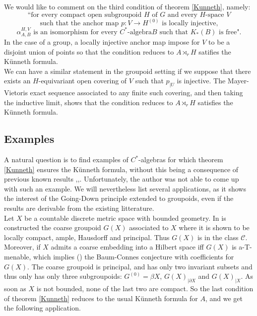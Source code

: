 \begin{rk}
We would like to comment on the third condition of theorem \ref{Kunneth}, namely:
\[\text{``for every compact open subgroupoid }H \text{ of } G \text{ and every }H \text{-space }V \]
\[\text{ such that the anchor map }p : V \rightarrow H^{(0)}\text{ is locally injective, }\]
\[\alpha_{A,B}^{H,V}\text{ is an isomorphism for every } C^*\text{-algebra} B \text{ such that $K_*(B)$ is free".}\]
In the case of a group, a locally injective anchor map impose for $V$ to be a disjoint union of points so that the condition reduces to $A\rtimes_r H$ satifies the Künneth formula. \\

We can have a similar statement in the groupoid setting if we suppose that there exists an $H$-equivariant open covering of $V$ such that $p_{|U}$ is injective. The Mayer-Vietoris exact sequence associated to any finite such covering, and then taking the inductive limit, shows that the condition reduces to $A\rtimes_r H$ satisfies the Künneth formula.  
\end{rk}


\subsection{Examples}

A natural question is to find examples of $C^*$-algebras for which theorem \ref{Kunneth} ensures the Künneth formula, without this being a consequence of previous known results \cite{RosenbergKunneth},\cite{ChabertEOY},\cite{OY4}. Unfortunately, the author was not able to come up with such an example. We will nevertheless list several applications, as it shows the interest of the Going-Down principle extended to groupoids, even if the results are derivable from the existing litterature.\\

Let $X$ be a countable discrete metric space with bounded geometry. In \cite{SkTuYu} is constructed the coarse groupoid $G(X)$ associated to $X$ where it is shown to be locally compact, ample, Hausdorff and principal. Thus $G(X)$ is in the class $\mathcal C$. Moreover, if $X$ admits a coarse embedding into a Hilbert space iff $G(X)$ is a-T-menable, which implies (\cite{TuThese}) the Baum-Connes conjecture with coefficients for $G(X)$. The coarse groupoid is principal, and has only two invariant subsets and thus only has only three subgroupoids: $G^{(0)}= \beta X$, $G(X)_{|\partial X}$ and $G(X)_{|X}$. As soon as $X$ is not bounded, none of the last two are compact. So the last condition of theorem \ref{Kunneth} reduces to the usual Künneth formula for $A$, and we get the following application. \\

